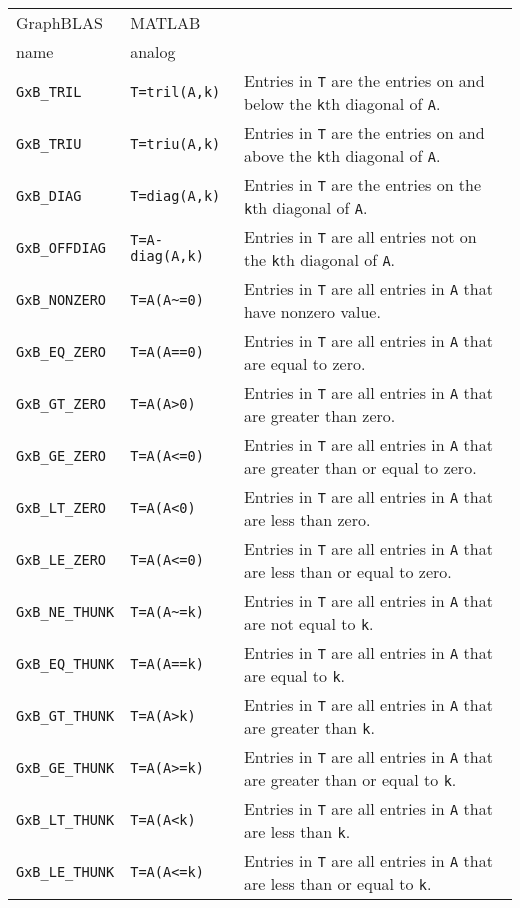 \documentclass[12pt]{article}
\begin{document}
\vspace{0.2in}
{\small
\begin{tabular}{llp{3in}}
\hline
GraphBLAS               & MATLAB            & \\
name                    & analog            & \\
\hline
\verb'GxB_TRIL'         & \verb'T=tril(A,k)'   &
    Entries in \verb'T' are the entries on and below the \verb'k'th diagonal of \verb'A'. \\
\verb'GxB_TRIU'         & \verb'T=triu(A,k)'   &
    Entries in \verb'T' are the entries on and above the \verb'k'th diagonal of \verb'A'. \\
\verb'GxB_DIAG'         & \verb'T=diag(A,k)'   &
    Entries in \verb'T' are the entries on the \verb'k'th diagonal of \verb'A'. \\
\verb'GxB_OFFDIAG'      & \verb'T=A-diag(A,k)' &
    Entries in \verb'T' are all entries not on the \verb'k'th diagonal of \verb'A'. \\
\hline
\verb'GxB_NONZERO'      & \verb'T=A(A~=0)'     &
    Entries in \verb'T' are all entries in \verb'A' that have nonzero value. \\
\verb'GxB_EQ_ZERO'      & \verb'T=A(A==0)'     &
    Entries in \verb'T' are all entries in \verb'A' that are equal to zero. \\
\verb'GxB_GT_ZERO'      & \verb'T=A(A>0)'      &
    Entries in \verb'T' are all entries in \verb'A' that are greater than zero. \\
\verb'GxB_GE_ZERO'      & \verb'T=A(A<=0)'     &
    Entries in \verb'T' are all entries in \verb'A' that are greater than or equal to zero. \\
\verb'GxB_LT_ZERO'      & \verb'T=A(A<0)'      &
    Entries in \verb'T' are all entries in \verb'A' that are less than zero. \\
\verb'GxB_LE_ZERO'      & \verb'T=A(A<=0)'     &
    Entries in \verb'T' are all entries in \verb'A' that are less than or equal to zero. \\
\hline
\verb'GxB_NE_THUNK'     & \verb'T=A(A~=k)'     &
    Entries in \verb'T' are all entries in \verb'A' that are not equal to \verb'k'. \\
\verb'GxB_EQ_THUNK'     & \verb'T=A(A==k)'     &
    Entries in \verb'T' are all entries in \verb'A' that are equal to \verb'k'. \\
\verb'GxB_GT_THUNK'     & \verb'T=A(A>k)'      &
    Entries in \verb'T' are all entries in \verb'A' that are greater than \verb'k'. \\
\verb'GxB_GE_THUNK'     & \verb'T=A(A>=k)'     &
    Entries in \verb'T' are all entries in \verb'A' that are greater than or equal to \verb'k'. \\
\verb'GxB_LT_THUNK'     & \verb'T=A(A<k)'      &
    Entries in \verb'T' are all entries in \verb'A' that are less than \verb'k'. \\
\verb'GxB_LE_THUNK'     & \verb'T=A(A<=k)'     &
    Entries in \verb'T' are all entries in \verb'A' that are less than or equal to \verb'k'. \\
\hline
\end{tabular}
}
\vspace{0.2in}
\end{document}
